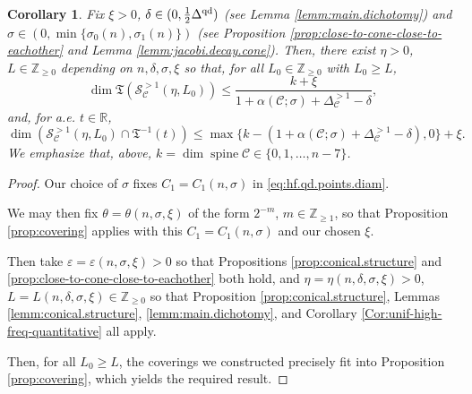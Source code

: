 \documentclass[11pt, letterpaper, reqno]{amsart}
\numberwithin{equation}{section}
\newtheorem{Cor}[Def]{Corollary}
\theoremstyle{remark}
\newcommand{\RR}{\mathbb{R}}
\newcommand{\ZZ}{\mathbb{Z}}
\newcommand{\cC}{\mathcal{C}}
\newcommand{\cS}{\mathcal{S}}
\newcommand{\frT}{\mathfrak{T}}
\newcommand{\spine}{\operatorname{spine}}
\newcommand{\eps}{\varepsilon}
\begin{document}
\begin{Cor} \label{coro:hf.qd.points}
	Fix $\xi > 0$, $\delta \in (0, \tfrac12 \Delta^{\textnormal{qd}}_{})$ (see Lemma \ref{lemm:main.dichotomy}) and $\sigma \in (0, \min \{ \sigma_0(n), \sigma_1(n) \})$ (see Proposition \ref{prop:close-to-cone-close-to-eachother} and Lemma \ref{lemm:jacobi.decay.cone}). Then, there exist $\eta > 0$, $L \in \ZZ_{\geq 0}$ depending on $n, \delta, \sigma, \xi$ so that, for all $L_0 \in \ZZ_{\geq 0}$ with $L_0 \geq L$, 
	\begin{equation} \label{eq:hf.qd.points.dim.epsilon}
		\dim \frT(\cS^{>1}_\cC(\eta, L_0)) \leq \frac{k + \xi}{1 + \alpha(\cC; \sigma) + \Delta^{>1}_{\cC} - \delta},
	\end{equation}
	and, for a.e. $t \in \RR$,
	\begin{equation} \label{eq:hf.qd.points.codim.epsilon}
		\dim (\cS^{>1}_\cC(\eta, L_0) \cap \frT^{-1}(t)) \leq \max \{ k - (1 + \alpha(\cC; \sigma) + \Delta^{>1}_{\cC} - \delta), 0 \} + \xi.
	\end{equation}
	We emphasize that, above, $k = \dim \spine \cC \in \{ 0, 1, \ldots, n-7 \}$. 
\end{Cor}
\begin{proof}
    Our choice of $\sigma$ fixes $C_1 = C_1(n, \sigma)$ in \eqref{eq:hf.qd.points.diam}. 
    
    We may then fix $\theta = \theta(n, \sigma, \xi)$ of the form $2^{-m}$, $m \in \ZZ_{\geq 1}$, so that Proposition \ref{prop:covering} applies with this $C_1 = C_1(n, \sigma)$ and our chosen $\xi$. 
	
	Then take $\eps = \eps(n, \sigma, \xi) > 0$ so that Propositions \ref{prop:conical.structure} and  \ref{prop:close-to-cone-close-to-eachother} both hold, and $\eta = \eta(n, \delta, \sigma, \xi) > 0$, $L = L(n, \delta, \sigma, \xi) \in \ZZ_{\geq 0}$ so that Proposition \ref{prop:conical.structure}, Lemmas \ref{lemm:conical.structure}, \ref{lemm:main.dichotomy}, and Corollary \ref{Cor:unif-high-freq-quantitative} all apply. 
    
    Then, for all $L_0 \geq L$, the coverings we constructed precisely fit into Proposition \ref{prop:covering}, which yields the required result.
\end{proof}
\end{document}

